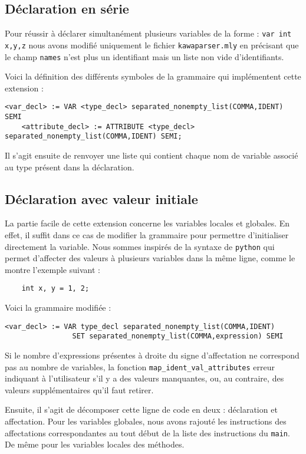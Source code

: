 \documentclass{article}
\begin{document}
\subsection{Déclaration en série}
Pour réussir à déclarer simultanément plusieurs variables de la forme : 
\texttt{var int x,y,z} nous avons modifié uniquement le fichier 
\texttt{kawaparser.mly} en précisant que le champ \texttt{names} 
n'est plus un identifiant mais un liste non vide d'identifiants.

Voici la définition des différents symboles de la grammaire qui implémentent cette extension : 
\begin{lstlisting}[style=mystyle]
    <var_decl> := VAR <type_decl> separated_nonempty_list(COMMA,IDENT) SEMI
    <attribute_decl> := ATTRIBUTE <type_decl> separated_nonempty_list(COMMA,IDENT) SEMI;
\end{lstlisting}

Il s'agit ensuite de renvoyer une liste qui contient chaque nom de variable associé 
au type présent dans la déclaration.


\subsection{Déclaration avec valeur initiale}
La partie facile de cette extension concerne les variables locales et globales.
En effet, il suffit dans ce cas de modifier la grammaire pour permettre d'initialiser directement la variable.
Nous sommes inspirés de la syntaxe de \texttt{python} qui permet d'affecter des valeurs 
à plusieurs variables dans la même ligne, comme le montre l'exemple suivant : 
\begin{verbatim}
    int x, y = 1, 2;
\end{verbatim}
Voici la grammaire modifiée : 
\begin{lstlisting}[style=mystyle]
    <var_decl> := VAR type_decl separated_nonempty_list(COMMA,IDENT) 
                SET separated_nonempty_list(COMMA,expression) SEMI
\end{lstlisting}
Si le nombre d'expressions présentes à droite du signe d'affectation ne 
correspond pas au nombre de variables, la fonction \texttt{map\_ident\_val\_attributes} 
erreur indiquant à l'utilisateur 
s'il y a des valeurs manquantes, ou, 
au contraire, des valeurs supplémentaires qu'il faut retirer.


Ensuite, il s'agit de décomposer cette ligne de code en deux : déclaration et affectation. 
Pour les variables globales, nous avons rajouté les instructions des affectations correspondantes 
au tout début de la liste des instructions du \texttt{main}. 
De même pour les variables locales des méthodes.
\end{document}
